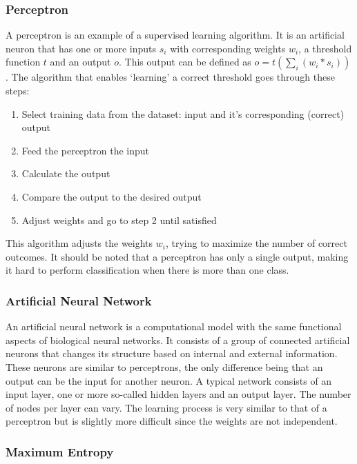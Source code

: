 \documentclass[11pt]{article}
\begin{document}


\subsubsection{Perceptron}

A perceptron is an example of a supervised learning algorithm. It is an artificial neuron that has one or more inputs $s_i$ with corresponding weights $w_i$, a threshold function $t$ and an output $o$. This output can be defined as $o = t(\sum_i(w_i * s_i))$. The algorithm that enables `learning' a correct threshold goes through these steps:
\begin{enumerate}
\item Select training data from the dataset: input and it's corresponding (correct) output
\item Feed the perceptron the input
\item Calculate the output
\item Compare the output to the desired output
\item Adjust weights and go to step 2 until satisfied
\end{enumerate}

This algorithm adjusts the weights $w_i$, trying to maximize the number of correct outcomes. It should be noted that a perceptron has only a single output, making it hard to perform classification when there is more than one class. 

\subsubsection{Artificial Neural Network}
 An artificial neural network is a computational model with the same functional aspects of biological neural networks. It consists of a group of connected artificial neurons that changes its structure based on internal and external information. These neurons are similar to perceptrons, the only difference being that an output can be the input for another neuron. A typical network consists of an input layer, one or more so-called hidden layers and an output layer. The number of nodes per layer can vary. The learning process is very similar to that of a perceptron but is slightly more difficult since the weights are not independent.

\subsubsection{Maximum Entropy}
\end{document}
